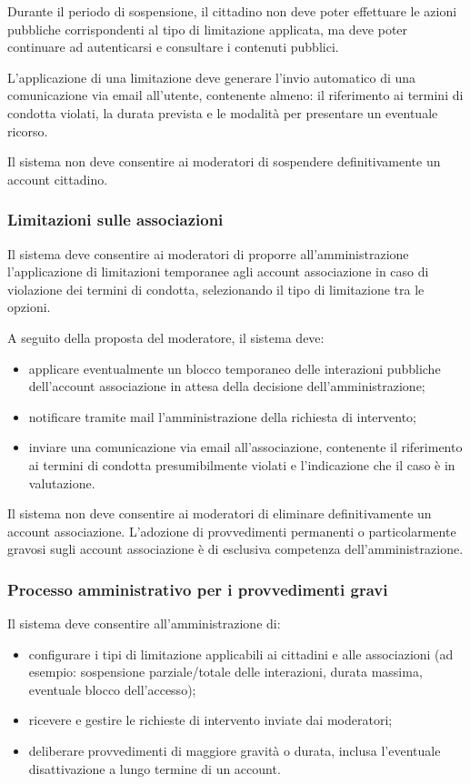 \begin{rfscope}
Durante il periodo di sospensione, il cittadino non deve poter effettuare le azioni pubbliche corrispondenti al tipo di limitazione applicata, ma deve poter continuare ad autenticarsi e consultare i contenuti pubblici.

L’applicazione di una limitazione deve generare l’invio automatico di una comunicazione via email all’utente, contenente almeno: il riferimento ai termini di condotta violati, la durata prevista e le modalità per presentare un eventuale ricorso.

Il sistema non deve consentire ai moderatori di sospendere definitivamente un account cittadino.

\subsubsection{Limitazioni sulle associazioni} \label{rf:moderazioneassociazioni}
Il sistema deve consentire ai moderatori di proporre all’amministrazione l’applicazione di limitazioni temporanee agli account associazione in caso di violazione dei termini di condotta, selezionando il tipo di limitazione tra le opzioni.

A seguito della proposta del moderatore, il sistema deve:
\begin{itemize}
  \item applicare eventualmente un blocco temporaneo delle interazioni pubbliche dell’account associazione in attesa della decisione dell’amministrazione;
  \item notificare tramite mail l’amministrazione della richiesta di intervento;
  \item inviare una comunicazione via email all’associazione, contenente il riferimento ai termini di condotta presumibilmente violati e l’indicazione che il caso è in valutazione.
\end{itemize}

Il sistema non deve consentire ai moderatori di eliminare definitivamente un account associazione. L’adozione di provvedimenti permanenti o particolarmente gravosi sugli account associazione è di esclusiva competenza dell’amministrazione.

\subsubsection{Processo amministrativo per i provvedimenti gravi} \label{red:modoerazioneprocamm}
Il sistema deve consentire all’amministrazione di:
\begin{itemize}
  \item configurare i tipi di limitazione applicabili ai cittadini e alle associazioni (ad esempio: sospensione parziale/totale delle interazioni, durata massima, eventuale blocco dell’accesso);
  \item ricevere e gestire le richieste di intervento inviate dai moderatori;
  \item deliberare provvedimenti di maggiore gravità o durata, inclusa l’eventuale disattivazione a lungo termine di un account.
\end{itemize}


\end{rfscope}
